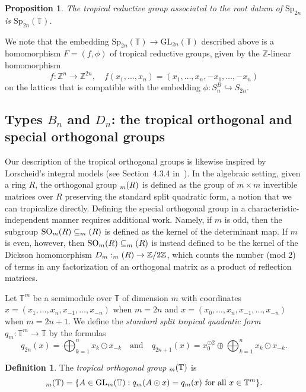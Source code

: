\documentclass[10pt, a4paper]{amsart}
\newtheorem{proposition}[theorem]{Proposition}
\theoremstyle{definition}
\newtheorem{definition}[theorem]{Definition}
\theoremstyle{myitemstyle}
\newcommand{\Z}{\mathbb{Z}}
\newcommand{\ZZ}{\mathbb{Z}}
\newcommand{\TT}{\mathbb{T}}
\newcommand{\GL}{{\mathrm{GL}}}
\newcommand{\Sp}{{\mathrm{Sp}}}
\newcommand{\SO}{{\mathrm{SO}}}
\let\O\relax
\DeclareMathOperator{\O}{O}
\begin{document}
\begin{proposition}
\label{prop:SP}
The tropical reductive group associated to the root datum of $\Sp_{2n}$ is $\Sp_{2n}(\TT)$.
    
\end{proposition}

We note that the embedding $\Sp_{2n}(\TT)\to \GL_{2n}(\TT)$ described above is a homomorphism $F=(f,\phi)$ of tropical reductive groups, given by the $\Z$-linear homomorphism 
\[f:\Z^n \to \Z^{2n}, \quad f(x_1,\ldots,x_n) = (x_1,\ldots,x_n,-x_1,\ldots,-x_n)\]
on the lattices that is compatible with the embedding $\phi:S_n^B \hookrightarrow S_{2n}$.





\subsection{Types $B_n$ and $D_n$: the tropical orthogonal and special orthogonal groups} Our description of the tropical orthogonal groups is likewise inspired by Lorscheid's integral models (see Section~4.3.4 in~\cite{Lorscheid_blueprintsII}). In the algebraic setting, given a ring $R$, the orthogonal group $\O_m(R)$ is defined as the group of $m\times m$ invertible matrices over $R$ preserving the standard split quadratic form, a notion that we can tropicalize directly. Defining the special orthogonal group in a characteristic-independent manner requires additional work. Namely, if $m$ is odd, then the subgroup $\SO_m(R)\subseteq \O_m(R)$ is defined as the kernel of the determinant map. If $m$ is even, however, then $\SO_m(R)\subseteq \O_m(R)$ is instead defined to be the kernel of the Dickson homomorphism $D_m:\O_m(R)\to \ZZ/2\ZZ$, which counts the number (mod 2) of terms in any factorization of an orthogonal matrix as a product of reflection matrices. 


Let $\TT^m$ be a semimodule over $\TT$ of dimension $m$ with coordinates $x=(x_1,\ldots,x_n,x_{-1},\ldots,x_{-n})$ when $m=2n$ and $x=(x_0,\ldots,x_n,x_{-1},\ldots,x_{-n})$ when $m=2n+1$. We define the \emph{standard split tropical quadratic form} $q_m:\TT^m\to \TT$ by the formulas
\[
q_{2n}(x)=\bigoplus_{k=1}^{n} x_k \odot x_{-k}\quad \text{and}\quad q_{2n+1}(x)= x_{0}^{\odot 2} \oplus \bigoplus_{k=1}^{n} x_k \odot x_{-k}.
\]

\begin{definition} The \emph{tropical orthogonal group} $\O_m(\TT)$ is
\[
\O_m(\TT)=\{A\in \GL_m(\TT):q_m(A\odot x)=q_m(x)\mbox{ for all }x\in \TT^m\}.
\]
\end{definition}
\end{document}
